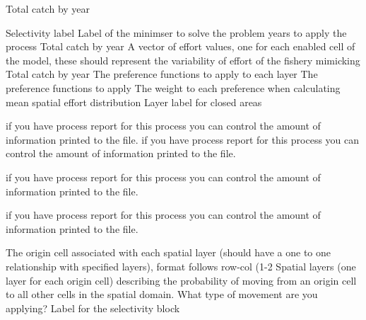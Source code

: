  {Total catch by year}
\par\textbf{}\par
{} {Selectivity label}
 {Label of the minimser to solve the problem}
 {years to apply the process}
 {Total catch by year}
 {A vector of effort values, one for each enabled cell of the model, these should represent the variability of effort of the fishery mimicking}
 {Total catch by year}
 {The preference functions to apply to each layer}
 {The preference functions to apply}
 {The weight to each preference when calculating mean spatial effort distribution}
 {Layer label for closed areas}
\par\textbf{}\par
{} {if you have process report for this process you can control the amount of information printed to the file.}
 {if you have process report for this process you can control the amount of information printed to the file.}
\par\textbf{}\par
{} {if you have process report for this process you can control the amount of information printed to the file.}
\par\textbf{}\par
{} {if you have process report for this process you can control the amount of information printed to the file.}
\par\textbf{}\par
{} {The origin cell associated with each spatial layer (should have a one to one relationship with specified layers), format follows row-col (1-2}
 {Spatial layers (one layer for each origin cell) describing the probability of moving from an origin cell to all other cells in the spatial domain.}
 {What type of movement are you applying?}
 {Label for the selectivity block}

